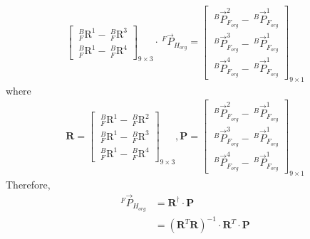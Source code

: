 \documentclass[12pt]{article}
\begin{document}
\begin{CJK}{UTF8}{bsmi}
\begin{equation}
\begin{split}
\begin{bmatrix}
\  _{F}^{B}\textrm{R}^{1} - \  _{F}^{B}\textrm{R}^{3}\\ 
\  _{F}^{B}\textrm{R}^{1} - \  _{F}^{B}\textrm{R}^{4}
\end{bmatrix}_{9 \times 3}
\cdot\ ^{F}\vec{P}_{H_{org}}
=
\begin{bmatrix}
\ ^{B}\vec{P}_{F_{org}}^{2} -\ ^{B}\vec{P}_{F_{org}}^{1} \\ 
\ ^{B}\vec{P}_{F_{org}}^{3} -\ ^{B}\vec{P}_{F_{org}}^{1} \\ 
\ ^{B}\vec{P}_{F_{org}}^{4} -\ ^{B}\vec{P}_{F_{org}}^{1} 
\end{bmatrix}_{9 \times 1}
\end{split}
\end{equation}
where
\begin{equation*}
\begin{split}
\textbf{R} =  
\begin{bmatrix}
\  _{F}^{B}\textrm{R}^{1} - \  _{F}^{B}\textrm{R}^{2}\\ 
\  _{F}^{B}\textrm{R}^{1} - \  _{F}^{B}\textrm{R}^{3}\\ 
\  _{F}^{B}\textrm{R}^{1} - \  _{F}^{B}\textrm{R}^{4}
\end{bmatrix}_{9 \times 3}, 
\textbf{P} = 
\begin{bmatrix}
\ ^{B}\vec{P}_{F_{org}}^{2} -\ ^{B}\vec{P}_{F_{org}}^{1} \\ 
\ ^{B}\vec{P}_{F_{org}}^{3} -\ ^{B}\vec{P}_{F_{org}}^{1} \\ 
\ ^{B}\vec{P}_{F_{org}}^{4} -\ ^{B}\vec{P}_{F_{org}}^{1} 
\end{bmatrix}_{9 \times 1}
\end{split}
\end{equation*}
Therefore,
\begin{equation*}
\begin{split}
^{F}\vec{P}_{H_{org}} &= \textbf{R}^{\dagger} \cdot \textbf{P}\\
					  &= \left( \textbf{R}^T\textbf{R}\right) ^{-1}\cdot \textbf{R}^T\cdot \textbf{P}
\end{split}
\end{equation*}


\end{CJK}
\end{document}
